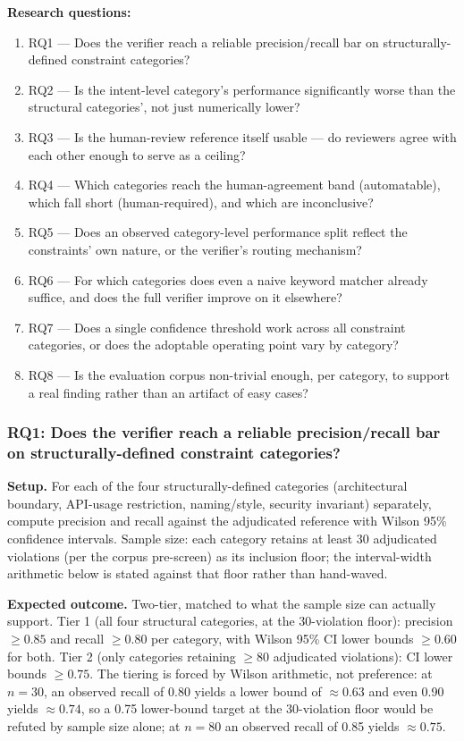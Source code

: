 \documentclass[11pt]{article}
\begin{document}
\textbf{Research questions:}
\begin{enumerate}[leftmargin=1.6em]
\item RQ1 --- Does the verifier reach a reliable precision/recall bar on structurally-defined constraint categories?
\item RQ2 --- Is the intent-level category's performance significantly worse than the structural categories', not just numerically lower?
\item RQ3 --- Is the human-review reference itself usable --- do reviewers agree with each other enough to serve as a ceiling?
\item RQ4 --- Which categories reach the human-agreement band (automatable), which fall short (human-required), and which are inconclusive?
\item RQ5 --- Does an observed category-level performance split reflect the constraints' own nature, or the verifier's routing mechanism?
\item RQ6 --- For which categories does even a naive keyword matcher already suffice, and does the full verifier improve on it elsewhere?
\item RQ7 --- Does a single confidence threshold work across all constraint categories, or does the adoptable operating point vary by category?
\item RQ8 --- Is the evaluation corpus non-trivial enough, per category, to support a real finding rather than an artifact of easy cases?
\end{enumerate}

\subsubsection{RQ1: Does the verifier reach a reliable precision/recall bar on structurally-defined constraint categories?}
\textbf{Setup.} For each of the four structurally-defined categories (architectural boundary, API-usage restriction, naming/style, security invariant) separately, compute precision and recall against the adjudicated reference with Wilson 95\% confidence intervals. Sample size: each category retains at least 30 adjudicated violations (per the corpus pre-screen) as its inclusion floor; the interval-width arithmetic below is stated against that floor rather than hand-waved.

\textbf{Expected outcome.} Two-tier, matched to what the sample size can actually support. Tier 1 (all four structural categories, at the 30-violation floor): precision $\geq 0.85$ and recall $\geq 0.80$ per category, with Wilson 95\% CI lower bounds $\geq 0.60$ for both. Tier 2 (only categories retaining $\geq 80$ adjudicated violations): CI lower bounds $\geq 0.75$. The tiering is forced by Wilson arithmetic, not preference: at $n = 30$, an observed recall of 0.80 yields a lower bound of $\approx 0.63$ and even 0.90 yields $\approx 0.74$, so a 0.75 lower-bound target at the 30-violation floor would be refuted by sample size alone; at $n = 80$ an observed recall of 0.85 yields $\approx 0.75$.
\end{document}
